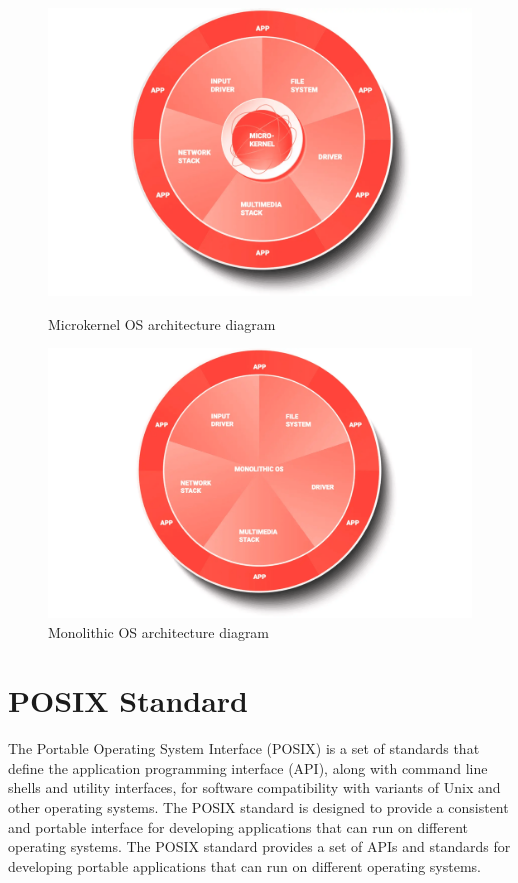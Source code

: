 \documentclass{article}
\begin{document}
\begin{figure}[h!]
    \centering
    \begin{minipage}{0.45\textwidth}
        \centering
        \includegraphics[width=\textwidth]{graph1.png} %
        \caption{Microkernel OS architecture diagram \citep{WhatsRTOS2024}}
        \label{fig:microkernel}
    \end{minipage}
    \hfill
    \begin{minipage}{0.45\textwidth}
        \centering
        \includegraphics[width=\textwidth]{graph3.png} %
        \caption{Monolithic OS architecture diagram \citep{WhatsRTOS2024}}
        \label{fig:monolithic}
    \end{minipage}
\end{figure}
\FloatBarrier

\section{POSIX Standard}
\label{sec:posix-standard}
The Portable Operating System Interface (POSIX) is a set of standards that define the application programming interface (API), along with command line shells and utility interfaces, for software compatibility with variants of Unix and other operating systems.
The POSIX standard is designed to provide a consistent and portable interface for developing applications that can run on different operating systems.
The POSIX standard provides a set of APIs and standards for developing portable applications that can run on different operating systems.
\end{document}
